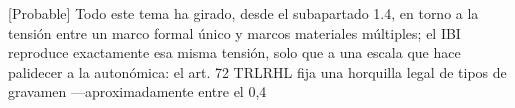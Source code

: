 \documentclass[10pt,a4paper]{article}
\begin{document}
[Probable] Todo este tema ha girado, desde el subapartado 1.4, en torno a la tensión entre un marco formal único y marcos materiales múltiples; el IBI reproduce exactamente esa misma tensión, solo que a una escala que hace palidecer a la autonómica: el art. 72 TRLRHL fija una horquilla legal de tipos de gravamen —aproximadamente entre el 0,4%
\end{document}
